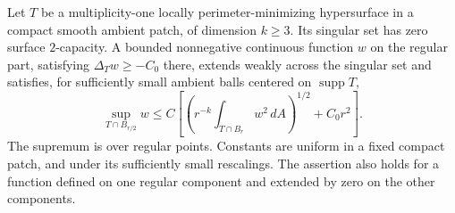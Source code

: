 \begin{lemma}
\label{var:capacity-submean}
Let $T$ be a multiplicity-one locally perimeter-minimizing hypersurface
in a compact smooth ambient patch, of dimension $k\geq3$.  Its singular
set has zero surface $2$-capacity.  A bounded nonnegative continuous function $w$
on the regular part, satisfying $\Delta_T w\geq-C_0$ there, extends
weakly across the singular set and satisfies, for sufficiently small
ambient balls centered on $\operatorname{supp}T$,
\begin{equation}\label{var:surface-submean}
 \sup_{T\cap B_{r/2}}w
 \leq C\left[
       \left(r^{-k}\int_{T\cap B_r}w^2\,dA\right)^{1/2}
          +C_0r^2\right].
\end{equation}
The supremum is over regular points.  Constants are uniform in a
fixed compact patch, and under its sufficiently small rescalings.
The assertion also holds for a function defined on one regular
component and extended by zero on the other components.
\end{lemma}

